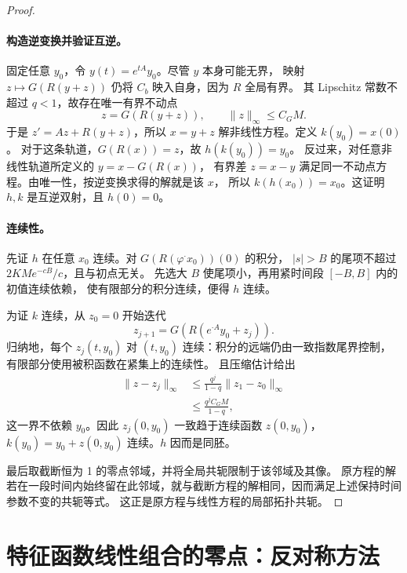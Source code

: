 \begin{proof}
\paragraph{构造逆变换并验证互逆。}
固定任意 $y_0$，令 $y(t)=e^{tA}y_0$。尽管 $y$ 本身可能无界，
映射 $z\mapsto G(R(y+z))$ 仍将 $C_b$ 映入自身，因为 $R$ 全局有界。
其 Lipschitz 常数不超过 $q<1$，故存在唯一有界不动点
\[
 z=G(R(y+z)),\qquad \|z\|_\infty\leq C_GM.
\]
于是 $z'=Az+R(y+z)$，所以 $x=y+z$ 解非线性方程。定义 $k(y_0)=x(0)$。
对于这条轨道，$G(R(x))=z$，故 $h(k(y_0))=y_0$。
反过来，对任意非线性轨道所定义的 $y=x-G(R(x))$，
有界差 $z=x-y$ 满足同一不动点方程。由唯一性，按逆变换求得的解就是该 $x$，
所以 $k(h(x_0))=x_0$。这证明 $h,k$ 是互逆双射，且 $h(0)=0$。

\paragraph{连续性。}
先证 $h$ 在任意 $x_0$ 连续。对 $G(R(\varphi^{\cdot}x_0))(0)$ 的积分，
$|s|>B$ 的尾项不超过 $2KM e^{-cB}/c$，且与初点无关。
先选大 $B$ 使尾项小，再用紧时间段 $[-B,B]$ 内的初值连续依赖，
使有限部分的积分连续，便得 $h$ 连续。

为证 $k$ 连续，从 $z_0=0$ 开始迭代
\[
 z_{j+1}=G(R(e^{\cdot A}y_0+z_j)).
\]
归纳地，每个 $z_j(t,y_0)$ 对 $(t,y_0)$ 连续：积分的远端仍由一致指数尾界控制，
有限部分使用被积函数在紧集上的连续性。
且压缩估计给出
\[
 \begin{aligned}
 \|z-z_j\|_\infty&\leq\frac{q^j}{1-q}\|z_1-z_0\|_\infty\\
 &\leq\frac{q^j C_GM}{1-q},
\end{aligned}
\]
这一界不依赖 $y_0$。因此 $z_j(0,y_0)$ 一致趋于连续函数 $z(0,y_0)$，
$k(y_0)=y_0+z(0,y_0)$ 连续。$h$ 因而是同胚。

最后取截断恒为 1 的零点邻域，并将全局共轭限制于该邻域及其像。
原方程的解若在一段时间内始终留在此邻域，就与截断方程的解相同，因而满足上述保持时间参数不变的共轭等式。
这正是原方程与线性方程的局部拓扑共轭。
\end{proof}

\section{特征函数线性组合的零点：反对称方法}

